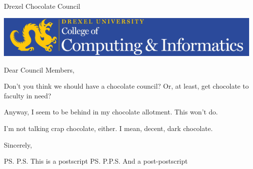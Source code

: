 \documentclass{letter}
\begin{document}

\begin{letter}{%
	Drexel Chocolate Council%
} 

\includegraphics[width=\textwidth]{cci-letterhead.png}



\opening{Dear Council Members,}
 
Don't you think we should have a chocolate council?  Or, at least, get chocolate to faculty in need?

Anyway, I seem to be behind in my chocolate allotment.  This won't do.


I'm not talking crap chocolate, either.  I mean, decent, dark chocolate.

\closing{Sincerely,}

\ps{P.S. This is a postscript}
\ps{P.P.S. And a post-postscript}

 


\end{letter}
 
\end{document}
